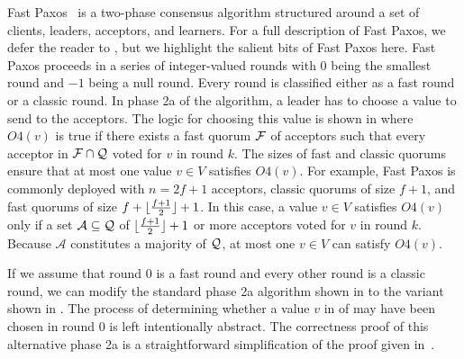 Fast Paxos~\cite{lamport2006fast} is a two-phase consensus algorithm structured
around a set of clients, leaders, acceptors, and learners. For a full
description of Fast Paxos, we defer the reader to \cite{lamport2006fast}, but
we highlight the salient bits of Fast Paxos here. Fast Paxos proceeds in a
series of integer-valued rounds with $0$ being the smallest round and $-1$
being a null round. Every round is classified either as a fast round or a
classic round. In phase 2a of the algorithm, a leader has to choose a value to
send to the acceptors. The logic for choosing this value is shown in
 where $O4(v)$ is true if there exists a fast quorum
$\mathcal{F}$ of acceptors such that every acceptor in $\mathcal{F} \cap
\mathcal{Q}$ voted for $v$ in round $k$. The sizes of fast and classic quorums
ensure that at most one value $v \in V$ satisfies $O4(v)$. For example, Fast
Paxos is commonly deployed with $n = 2f + 1$ acceptors, classic quorums of size
$f + 1$, and fast quorums of size $f + \lfloor\frac{f + 1}{2}\rfloor + 1$. In this case, a value $v
\in V$ satisfies $O4(v)$ only if a set $\mathcal{A} \subseteq \mathcal{Q}$ of
$\lfloor\frac{f + 1}{2}\rfloor + 1$ or more acceptors voted for $v$ in round $k$. Because
$\mathcal{A}$ constitutes a majority of $\mathcal{Q}$, at most one $v \in V$ can
satisfy $O4(v)$.

If we assume that round $0$ is a fast round and every other round is a classic
round, we can modify the standard phase 2a algorithm shown in
 to the variant shown in . The
process of determining whether a value $v$ in  of
 may have been chosen in round $0$ is left
intentionally abstract. The correctness proof of this alternative phase 2a is a
straightforward simplification of the proof given in~\cite{lamport2006fast}.
